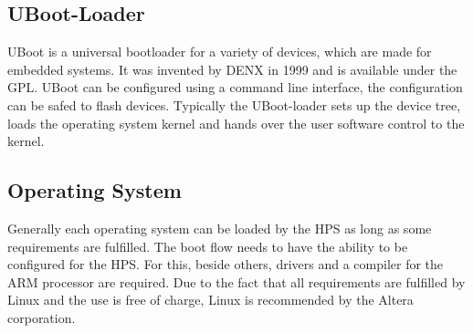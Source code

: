\subsection{UBoot-Loader}
UBoot is a universal bootloader for a variety of devices, which are made for embedded systems. It was invented by DENX in 1999 and is available under the GPL. UBoot can be configured using a command line interface, the configuration can be safed to flash devices. Typically the UBoot-loader sets up the device tree, loads the operating system kernel and hands over the user software control to the kernel.
\subsection{Operating System}
Generally each operating system can be loaded by the HPS as long as some requirements are fulfilled. The boot flow needs to have the ability to be configured for the HPS. For this, beside others, drivers and a compiler for the ARM processor are required. Due to the fact that all requirements are fulfilled by Linux and the use is free of charge, Linux is recommended by the Altera corporation.